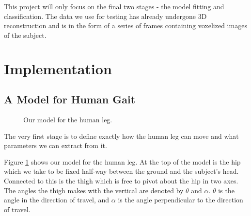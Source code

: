 \documentclass[a4paper,12pt]{article}
\begin{document}
This project will only focus on the final two stages - the model fitting and classification.
The data we use for testing has already undergone 3D reconstruction and is in the form of a series of frames containing voxelized images of the subject.


\newpage
\section{Implementation}

\subsection{A Model for Human Gait}

\begin{figure}[hb]
	\centering
	\qquad
	\caption{Our model for the human leg.}
	\label{ModelImages}
\end{figure}

The very first stage is to define exactly how the human leg can move and what parameters we can extract from it.

Figure \ref{ModelImages} shows our model for the human leg.
At the top of the model is the hip which we take to be fixed half-way between the ground and the subject's head.
Connected to this is the thigh which is free to pivot about the hip in two axes.
The angles the thigh makes with the vertical are denoted by $\theta$ and $\alpha$.
$\theta$ is the angle in the direction of travel, and $\alpha$ is the angle perpendicular to the direction of travel.
\end{document}
